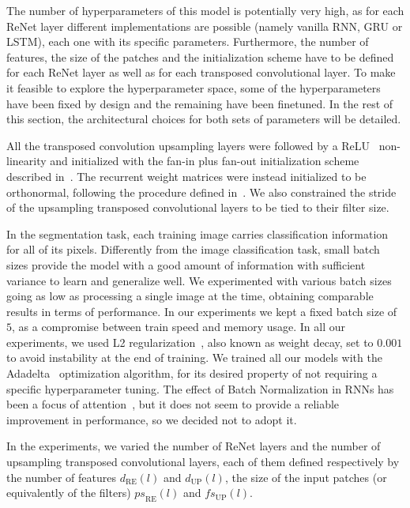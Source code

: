 \documentclass[times,art10,twocolumn,latex8]{article}
\begin{document}
The number of hyperparameters of this model is potentially very high, as for
each ReNet layer different implementations are possible (namely vanilla RNN,
GRU or LSTM), each one with its specific parameters. Furthermore, the number of
features, the size of the patches and the initialization scheme have to be
defined for each ReNet layer as well as for each transposed convolutional
layer. To make it feasible to explore the hyperparameter space, some of the
hyperparameters have been fixed by design and the remaining have been finetuned.
In the rest of this section, the architectural choices for both sets of
parameters will be detailed.

All the transposed convolution upsampling layers were followed by a
ReLU~\cite{Krizhevsky2012-alexnet} non-linearity and initialized with the
fan-in plus fan-out initialization scheme described
in~\cite{glorot2010understanding}. The recurrent weight matrices were instead
initialized to be orthonormal, following the procedure defined
in~\cite{Saxe2014}. We also constrained the stride of the upsampling transposed
convolutional layers to be tied to their filter size.

In the segmentation task, each training image carries classification
information for all of its pixels. Differently from the image classification
task, small batch sizes provide the model with a good amount of information
with sufficient variance to learn and generalize well. We experimented with
various batch sizes going as low as processing a single image at the time,
obtaining comparable results in terms of performance. In our experiments we
kept a fixed batch size of $5$, as a compromise between train speed and memory
usage. In all our experiments, we used L2
regularization~\cite{Krogh92asimple}, also known as weight decay, set to
$0.001$ to avoid instability at the end of training. We trained all our models
with the Adadelta~\cite{Zeiler-2012} optimization algorithm, for its desired
property of not requiring a specific hyperparameter tuning. The effect of Batch
Normalization in RNNs has been a focus of attention~\cite{Laurent2015}, but it
does not seem to provide a reliable improvement in performance, so we decided
not to adopt it.


In the experiments, we varied the number of ReNet layers and the number of
upsampling transposed convolutional layers, each of them defined respectively
by the number of features $d_{\text{RE}}(l)$ and $d_{\text{UP}}(l)$,
the size of the input patches (or equivalently of the filters)
${ps}_{\text{RE}}(l)$ and ${fs}_{\text{UP}}(l)$.
\end{document}
